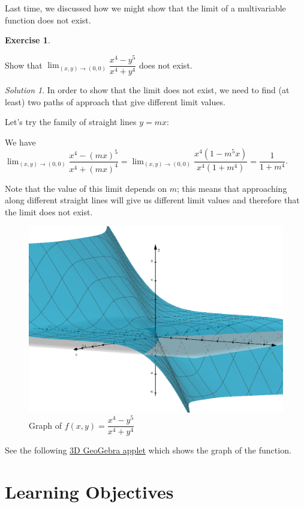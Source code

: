\documentclass[
]{book}
\theoremstyle{definition}
\theoremstyle{definition}
\theoremstyle{definition}
\newtheorem{exercise}{Exercise}[chapter]
\theoremstyle{definition}
\theoremstyle{remark}
\newtheorem*{solution}{Solution}
\begin{document}
Last time, we discussed how we might show that the limit of a multivariable function does not exist.

\begin{exercise}
\protect\hypertarget{exr:unlabeled-div-12}{}\label{exr:unlabeled-div-12}

Show that \(\displaystyle \lim_{(x,y)\to(0,0)}\dfrac{x^4-y^5}{x^4+y^4}\) does not exist.

\end{exercise}

\begin{solution}

In order to show that the limit does not exist, we need to find (at least) two paths of approach that give different limit values.

Let's try the family of straight lines \(y=mx\):

We have \(\displaystyle \lim_{(x,y)\to(0,0)}\dfrac{x^4-(mx)^5}{x^4+(mx)^4}=\displaystyle \lim_{(x,y)\to(0,0)}\dfrac{x^4(1-m^5x)}{x^4(1+m^4)}=\displaystyle \dfrac{1}{1+m^4}\).

Note that the value of this limit depends on \(m\); this means that approaching along different straight lines will give us different limit values and therefore that the limit does not exist.

\end{solution}

\begin{figure}

{\centering \includegraphics[width=0.5\linewidth]{images/lec-3-ex-1} 

}

\caption{Graph of $f(x,y)=\dfrac{x^4-y^5}{x^4+y^4}$}\label{fig:unnamed-chunk-10}
\end{figure}

See the following \href{https://www.geogebra.org/m/gbyuggth}{3D GeoGebra applet} which shows the graph of the function.

\hypertarget{learning-objectives-2}{%
\section{Learning Objectives}\label{learning-objectives-2}}
\end{document}
